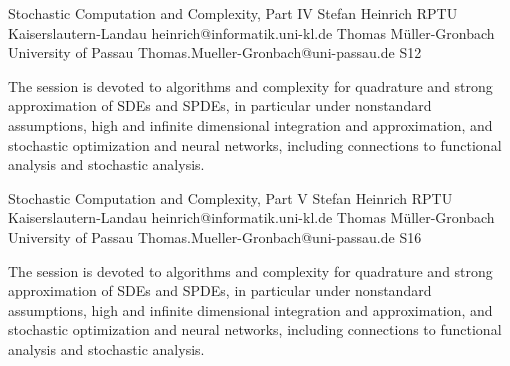 

\clearpage

\begin{session}
 {Stochastic Computation and Complexity, Part IV}%
 {Stefan Heinrich}%
 {RPTU Kaiserslautern-Landau}%
 {heinrich@informatik.uni-kl.de}%
 {Thomas M\"uller-Gronbach}%
 {University of Passau}%
 {Thomas.Mueller-Gronbach@uni-passau.de}%
 {S12}%
 {}%

 The session is devoted to algorithms and complexity for
 quadrature and strong approximation of SDEs and SPDEs, in particular under nonstandard assumptions,
 high and infinite dimensional integration and approximation, and
 stochastic optimization and neural networks,
 including connections to functional analysis and stochastic analysis.
 \medskip
\end{session}



\clearpage

\begin{session}
 {Stochastic Computation and Complexity, Part V}%
 {Stefan Heinrich}%
 {RPTU Kaiserslautern-Landau}%
 {heinrich@informatik.uni-kl.de}%
 {Thomas M\"uller-Gronbach}%
 {University of Passau}%
 {Thomas.Mueller-Gronbach@uni-passau.de}%
 {S16}%
 {}%

 The session is devoted to algorithms and complexity for
 quadrature and strong approximation of SDEs and SPDEs, in particular under nonstandard assumptions,
 high and infinite dimensional integration and approximation, and
 stochastic optimization and neural networks,
 including connections to functional analysis and stochastic analysis.
 \medskip
\end{session}

